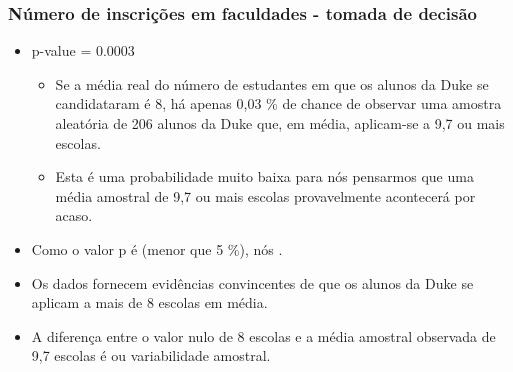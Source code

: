 \documentclass[11pt]{beamer}
\begin{document}

\begin{frame}
\frametitle{Número de inscrições em faculdades - tomada de decisão}

\begin{itemize}

\item p-value = 0.0003

\pause

\begin{itemize}
\item Se a média real do número de estudantes em que os alunos da Duke se candidataram é 8, há apenas 0,03 \% de chance de observar uma amostra aleatória de 206 alunos da Duke que, em média, aplicam-se a 9,7 ou mais escolas.

\pause
\item Esta é uma probabilidade muito baixa para nós pensarmos que uma média amostral de 9,7 ou mais escolas provavelmente acontecerá por acaso.
\end{itemize}

\pause
\item Como o valor p é  (menor que 5 \%), nós .

\pause
\item Os dados fornecem evidências convincentes de que os alunos da Duke se aplicam a mais de 8 escolas em média.

\pause
\item A diferença entre o valor nulo de 8 escolas e a média amostral observada de 9,7 escolas é  ou variabilidade amostral.

\end{itemize}

\end{frame}

\end{document}
